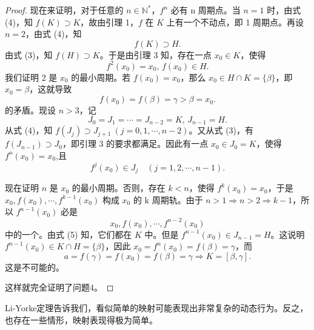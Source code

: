 \documentclass[12pt]{ctexart}
\begin{document}
\begin{proof}
现在来证明，对于任意的 $n \in \mathbb{N}^*$，$f^n$ 必有 n 周期点。当 $n = 1$ 时，由式 (4)，知 $f(K) \supset K$，故由引理 1，$f$ 在 $K$ 上有一个不动点，即 1 周期点。再设 $n = 2$，由式 (4)，知
\[
f(K) \supset H.
\]
由式 (3)，知 $f(H) \supset K$。于是由引理 3 知，存在一点 $x_0 \in K$，使得
\[
f^2(x_0) = x_0, \, f(x_0) \in H.
\]
我们证明 2 是 $x_0$ 的最小周期。若 $f(x_0) = x_0$，那么 $x_0 \in H \cap K = \{\beta\}$，即 $x_0 = \beta$，这就导致
\[
f(x_0) = f(\beta) = \gamma > \beta = x_0.
\]
的矛盾。现设 $n > 3$，记
\[
J_0 = J_1 = \cdots = J_{n-2} = K, \, J_{n-1} = H.
\]
从式 (4)，知 $f(J_j) \supset J_{j+1} \ (j = 0, 1, \cdots, n-2)$。又从式 (3)，有 $f(J_{n-1}) \supset J_0$，即引理 3 的要求都满足。因此有一点 $x_0 \in J_0 = K$，使得$f^n(x_0) = x_0$,且
\begin{equation}
f^j(x_0) \in J_j \quad (j = 1, 2, \cdots, n-1).\tag{5}
\end{equation}

现在证明 $n$ 是 $x_0$ 的最小周期。否则，存在 $k < n$，使得 $f^k(x_0) = x_0$，于是 $x_0, f(x_0), \cdots, f^{k-1}(x_0)$ 构成 $x_0$ 的 k 周期轨。由于 $n > 1 \Rightarrow n > 2 \Rightarrow k - 1$，所以 $f^{n-1}(x_0)$ 必是
\[
x_0, f(x_0), \cdots, f^{n-2}(x_0)
\]
中的一个。由式 (5) 知，它们都在 $K$ 中。但是 $f^{n-1}(x_0) \in J_{n-1} = H$。这说明 $f^{n-1}(x_0) \in K \cap H = \{\beta\}$，因此 $x_0 = f^{n}(x_0) = f(\beta) = \gamma$，而
\[
a = f(\gamma) = f(x_0) = f(\beta) = \gamma \Rightarrow K = [\beta, \gamma].
\]
这是不可能的。

这样就完全证明了问题4。

\end{proof}

\quad Li-Yorke定理告诉我们，看似简单的映射可能表现出非常复杂的动态行为。反之，也存在一些情形，映射表现得极为简单。

\newpage 
\nocite{*}

\printbibliography
\end{document}
